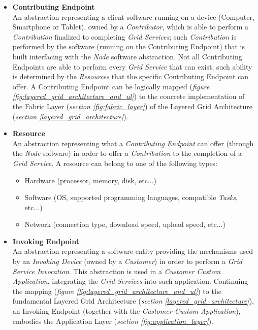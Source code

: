\begin{itemize}
    \item \textbf{Contributing Endpoint}\label{contributing_device}\\
    An abstraction representing a client software running on a device (Computer, Smartphone or Tablet), owned by a \textit{Contributor}, which is able to perform a \textit{Contribution} finalized to completing \textit{Grid Services}; such \textit{Contribution} is performed by the software (running on the Contributing Endpoint) that is built interfacing with the \textit{Node} software abstraction. Not all Contributing Endpoints are able to perform every \textit{Grid Service} that can exist; such ability is determined by the \textit{Resources} that the specific Contributing Endpoint can offer. A Contributing Endpoint can be logically mapped (\textit{figure \ref{fig:layered_grid_architecture_and_ul}}) to the concrete implementation of the Fabric Layer (\textit{section \ref{fig:fabric_layer}}) of the Layered Grid Architecture (\textit{section \ref{layered_grid_architecture}}).
    \item \textbf{Resource}\label{resource}\\
    An abstraction representing what a \textit{Contributing Endpoint} can offer (through the \textit{Node} software) in order to offer a \textit{Contribution} to the completion of a \textit{Grid Service}. A resource can belong to one of the following types:
    \begin{itemize}
        \item Hardware (processor, memory, disk, etc...)
        \item Software (OS, supported programming languages, compatible \textit{Tasks}, etc...)
        \item Network (connection type, download speed, upload speed, etc...)
    \end{itemize}
    \item \textbf{Invoking Endpoint}\label{invoking_endpoint}\\
    An abstraction representing a software entity providing the mechanisms used by an \textit{Invoking Device} (owned by a \textit{Customer}) in order to perform a \textit{Grid Service Invocation}. This abstraction is used in a \textit{Customer Custom Application}, integrating the \textit{Grid Services} into such application. Continuing the mapping (\textit{figure \ref{fig:layered_grid_architecture_and_ul}}) to the fundamental Layered Grid Architecture (\textit{section \ref{layered_grid_architecture}}), an Invoking Endpoint (together with the \textit{Customer Custom Application}), embodies the Application Layer (\textit{section \ref{fig:application_layer}}).

\end{itemize}
